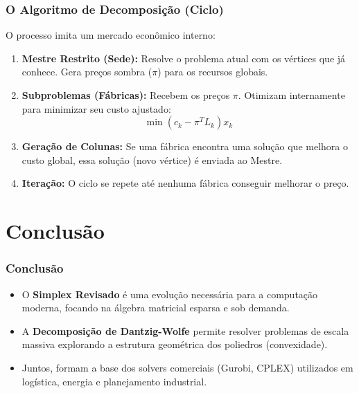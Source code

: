 \begin{frame}
\frametitle{O Algoritmo de Decomposição (Ciclo)}
O processo imita um mercado econômico interno:

\begin{enumerate}
    \item \textbf{Mestre Restrito (Sede):} Resolve o problema atual com os vértices que já conhece. Gera preços sombra ($\pi$) para os recursos globais.
    
    \item \textbf{Subproblemas (Fábricas):} Recebem os preços $\pi$. Otimizam internamente para minimizar seu custo ajustado:
    \[ \min (c_k - \pi^T L_k)x_k \]
    
    \item \textbf{Geração de Colunas:} Se uma fábrica encontra uma solução que melhora o custo global, essa solução (novo vértice) é enviada ao Mestre.
    
    \item \textbf{Iteração:} O ciclo se repete até nenhuma fábrica conseguir melhorar o preço.
\end{enumerate}
\end{frame}

\section{Conclusão}

\begin{frame}
\frametitle{Conclusão}
\begin{itemize}
    \item O \textbf{Simplex Revisado} é uma evolução necessária para a computação moderna, focando na álgebra matricial esparsa e sob demanda.
    \item A \textbf{Decomposição de Dantzig-Wolfe} permite resolver problemas de escala massiva explorando a estrutura geométrica dos poliedros (convexidade).
    \item Juntos, formam a base dos solvers comerciais (Gurobi, CPLEX) utilizados em logística, energia e planejamento industrial.
\end{itemize}
\end{frame}